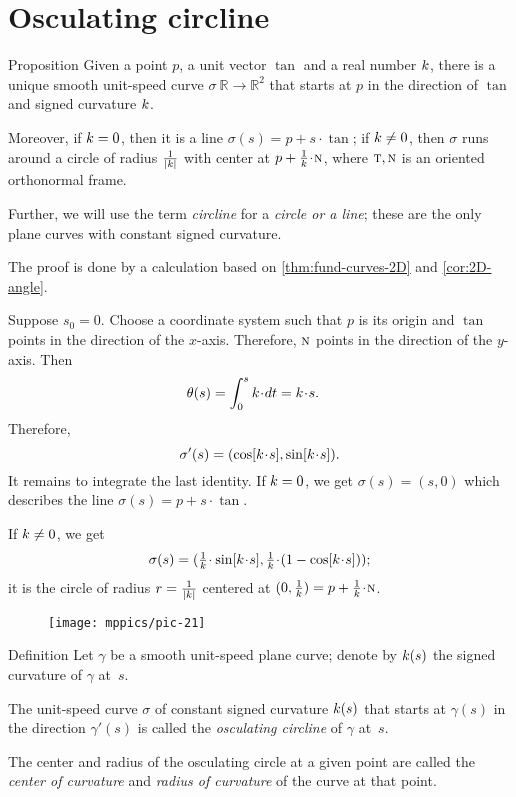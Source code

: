 \section{Osculating circline}

\begin{thm}{Proposition}\label{prop:circline}
Given a point $p$,
a unit vector $\tan$ 
and a real number $k$, there is a unique smooth unit-speed curve $\sigma\:\mathbb{R}\to\mathbb{R}^2$ 
that starts at $p$ in the direction of $\tan$ and signed curvature $k$.

Moreover, if $k=0$, then it is a line $\sigma(s)=p+s\cdot \tan$;
if $k\ne 0$, then $\sigma$ runs around a circle of radius $\tfrac1{|k|}$ with center at $p+\tfrac1\skur\cdot \norm$, where $\text{\sc{t}},\text{\sc{n}}$ is an oriented orthonormal frame.
\end{thm}

Further, we will use the term \emph{circline} for a \textit{circle or a line};
these are the only plane curves with constant signed curvature.

The proof is done by a calculation based on \ref{thm:fund-curves-2D} and \ref{cor:2D-angle}.

Suppose $s_0=0$.
Choose a coordinate system such that $p$ is its origin and $\tan$ points in the direction of the $x$-axis.
Therefore, $\text{\sc{n}}$ points in the direction of the $y$-axis.
Then
\begin{align*}\theta(s)&=\int_{0}^s\skur\cdot dt=\skur\cdot s.
\end{align*}
Therefore,
\[\sigma'(s)=(\cos[\skur\cdot s],\sin[\skur\cdot s]).\]
It remains to integrate the last identity.
If $k=0$, we get $\sigma(s)=(s,0)$
which describes the line $\sigma(s)=p+s\cdot \tan$.

If $k\ne 0$, we get
\[\sigma(s)=(\tfrac1\skur\cdot\sin[\skur\cdot s],
\tfrac1\skur\cdot(1-\cos[\skur\cdot s]));\]
it is the circle of radius $r=\tfrac1{|k|}$ centered at $(0,\tfrac1\skur)=p+\tfrac1\skur\cdot\norm$.
\qeds


\begin{wrapfigure}{r}{31 mm}
\vskip-0mm
\centering
\texttt{[image: mppics/pic-21]}
\vskip0mm
\end{wrapfigure}

\begin{thm}{Definition}
Let $\gamma$ be a smooth unit-speed plane curve;
denote by $k(s)$ the signed curvature of $\gamma$ at~$s$.

The unit-speed curve $\sigma$ of constant signed curvature $k(s)$ that starts at $\gamma(s)$ in the direction $\gamma'(s)$ is called the \emph{osculating circline} of $\gamma$ at~$s$.

The center and radius of the osculating circle at a given point are called the \emph{center of curvature} and \emph{radius of curvature} of the curve at that point.
\end{thm}

